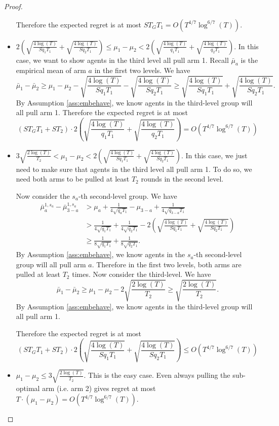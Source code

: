 \begin{proof}
\begin{itemize}
Therefore the expected regret is at most $S T_G T_1 = O(T^{4/7} \log^{6/7}(T))$. 


\item $2\left(\sqrt{\frac{4\log(T)}{Sq_1T_1}} 
+ \sqrt{\frac{4\log(T)}{Sq_2T_1}}\right) \leq \mu_1-\mu_2 < 2\left(\sqrt{\frac{4\log(T)}{q_1T_1}} 
+ \sqrt{\frac{4\log(T)}{q_2T_1}}\right)$. In this case, we want to show agents in the third level all pull arm 1. Recall $\bar{\mu}_a$ is the empirical mean of arm $a$ in the first two levels. We have
\[
\bar{\mu}_1 - \bar{\mu}_2 \geq \mu_1 -\mu_2 - \sqrt{\frac{4\log(T)}{Sq_1T_1}} - \sqrt{\frac{4\log(T)}{Sq_2T_1}} \geq  \sqrt{\frac{4\log(T)}{Sq_1T_1}} 
+ \sqrt{\frac{4\log(T)}{Sq_2T_1}}.
\]
By Assumption \ref{ass:embehave}, we know agents in the third-level group will all pull arm 1.
Therefore the expected regret is at most 
\[
(S T_G T_1 + S T_2) \cdot 2\left(\sqrt{\frac{4\log(T)}{q_1T_1}} 
+ \sqrt{\frac{4\log(T)}{q_2T_1}}\right) = O(T^{4/7} \log^{6/7}(T))
\]

\item $ 3\sqrt{\frac{2\log(T)}{T_2}} < \mu_1-\mu_2 < 2\left(\sqrt{\frac{4\log(T)}{Sq_1T_1}} 
+ \sqrt{\frac{4\log(T)}{Sq_2T_1}}\right)$. In this case, we just need to make sure that agents in the third level all pull arm 1. To do so, we need both arms to be pulled at least $T_2$ rounds in the second level.  

Now consider the $s_a$-th second-level group. We have
\begin{align*}
\bar{\mu}_a^{1,s_a} - \bar{\mu}_{3-a}^{1,s_a} &> \mu_a + \frac{1}{4\sqrt{q_aT_1}} -\mu_{3-a} +\frac{1}{4\sqrt{q_{3-a}T_1}} \\
&> \frac{1}{4\sqrt{q_1T_1}}+ \frac{1}{4\sqrt{q_2T_1}} - 2\left(\sqrt{\frac{4\log(T)}{Sq_1T_1}} 
+ \sqrt{\frac{4\log(T)}{Sq_2T_1}}\right) \\
&\geq \frac{1}{8\sqrt{q_1T_1}}+ \frac{1}{8\sqrt{q_2T_1}}.
\end{align*}
By Assumption \ref{ass:embehave}, we know agents in the $s_a$-th second-level group will all pull arm $a$. Therefore in the first two levels, both arms are pulled at least $T_2$ times. Now consider the third-level. We have
\[
\bar{\mu}_1 - \bar{\mu}_2  \geq \mu_1 -\mu_2 - 2\sqrt{\frac{2\log(T)}{T_2}} \geq \sqrt{\frac{2\log(T)}{T_2}}.
\]
By Assumption \ref{ass:embehave}, we know agents in the third-level group will all pull arm 1.

Therefore the expected regret is at most 
\[
(S T_G T_1 + S T_2) \cdot 2\left(\sqrt{\frac{4\log(T)}{Sq_1T_1}} 
+ \sqrt{\frac{4\log(T)}{Sq_2T_1}}\right) \leq O(T^{4/7} \log^{6/7}(T))
\]


\item $\mu_1 - \mu_2 \leq 3\sqrt{\frac{2\log(T)}{T_2}}$. This is the easy case. Even always pulling the sub-optimal arm (i.e. arm 2) gives regret at most $T \cdot (\mu_1-\mu_2) = O(T^{4/7} \log^{6/7}(T))$. 
\end{itemize}

\end{proof}
